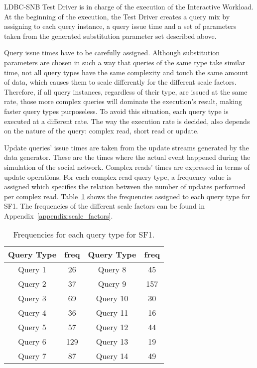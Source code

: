 LDBC-SNB Test Driver is in charge of the execution of the Interactive Workload.
At the beginning of the execution, the Test Driver creates a query mix by
assigning to each query instance, a query issue time and a set of parameters
taken from the generated substitution parameter set described above.  

Query issue times have to be carefully assigned.  Although substitution
parameters are chosen in such a way that queries of the same type take similar
time, not all query types have the same complexity and touch the same amount of
data, which causes them to scale differently for the different scale factors.
Therefore, if all query instances, regardless of their type, are issued
at the same rate, those more complex queries will dominate the execution's
result, making faster query types purposeless. To avoid this situation, each
query type is executed at a different rate. The way the execution rate is decided,
also depends on the nature of the query: complex read, short read or update.

Update queries' issue times are taken from the update streams generated by the
data generator. These are the times where the actual event happened during the
simulation of the social network. Complex reads' times are expressed in terms
of update operations. For each complex read query type, a frequency value is
assigned which specifies the relation between the number of updates performed
per complex read.  Table~\ref{table:freqs} shows the frequencies assigned to
each query type for SF1. The frequencies of the different scale factors can be
found in Appendix~\ref{appendix:scale_factors}.

\begin{table}[H]
\centering
    \begin{tabular}{|c|c|c|c|}
    \hline
    Query Type & freq & Query Type & freq \\ 
    \hline
    \hline
    Query 1 & 26 & Query 8 & 45 \\ 
    \hline       
    Query 2 & 37 & Query 9 & 157 \\  
    \hline        
    Query 3 & 69 & Query 10 & 30 \\ 
    \hline        
    Query 4 & 36 & Query 11 & 16 \\ 
    \hline        
    Query 5 & 57 & Query 12 & 44 \\ 
    \hline        
    Query 6 & 129 & Query 13 & 19 \\  
    \hline        
    Query 7 & 87 & Query 14 & 49 \\ 
    \hline
    \end{tabular}
    \caption{Frequencies for each query type for SF1.}
    \label{table:freqs}
\end{table}

